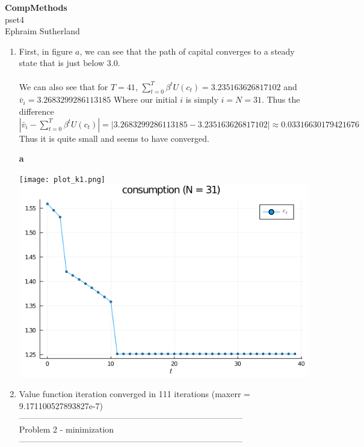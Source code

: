 \documentclass[12pt]{article}
\begin{document}
\begin{center}
{\large \bf CompMethods }   \\ \large pset4 \\ Ephraim Sutherland
\end{center}


\begin{enumerate}

	\item First, in figure $a$, we can see that the path of capital converges to a steady state that is just below 3.0. 
		\\\\  We can also see that for $T=41$,  $\sum_{t=0}^{T}\beta^t U(c_t) = 3.235163626817102 $
		and $\bar v_i = 3.2683299286113185$ Where our initial  $i$ is simply $i = N = 31$.
		Thus the  difference $ | \bar v_i - \sum_{t=0}^{T}\beta^t U(c_t) | = | 3.2683299286113185 - 3.235163626817102 | \approx 0.03316630179421676$ Thus it is quite small and seems to have converged.
		\begin{center}
			\textbf{a}\par\medskip
			\texttt{[image: plot\_k1.png]}
			\includegraphics[width=0.8\linewidth]{plot_c.png}
		\end{center}
	\item 
		Value function iteration converged in 111 iterations (maxerr = 9.171100527893827e-7)
		\\
		--------------------------------------------------------------------------------
		\\ Problem 2 - minimization \\
		--------------------------------------------------------------------------------

\end{enumerate}
\end{document}

